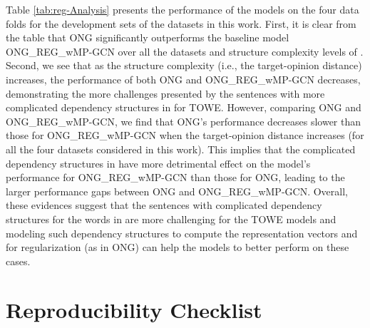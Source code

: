 \documentclass[11pt,a4paper]{article}
\begin{document}
Table \ref{tab:reg-Analysis} presents the performance of the models on the four data folds for the development sets of the datasets in this work. First, it is clear from the table that ONG significantly outperforms the baseline model ONG\_REG\_wMP-GCN over all the datasets and structure complexity levels of . Second, we see that as the structure complexity (i.e., the target-opinion distance) increases, the performance of both ONG and ONG\_REG\_wMP-GCN decreases, demonstrating the more challenges presented by the sentences with more complicated dependency structures in  for TOWE. However, comparing ONG and ONG\_REG\_wMP-GCN, we find that ONG's performance decreases slower than those for ONG\_REG\_wMP-GCN when the target-opinion distance increases (for all the four datasets considered in this work). This implies that the complicated dependency structures in  have more detrimental effect on the model's performance for ONG\_REG\_wMP-GCN than those for ONG, leading to the larger performance gaps between ONG and ONG\_REG\_wMP-GCN. Overall, these evidences suggest that the sentences with complicated dependency structures for the words in  are more challenging for the TOWE models and modeling such dependency structures to compute the representation vectors  and  for regularization (as in ONG) can help the models to better perform on these cases.







\fi

\iffalse
\section{Reproducibility Checklist}
\label{app:repo}
\end{document}
